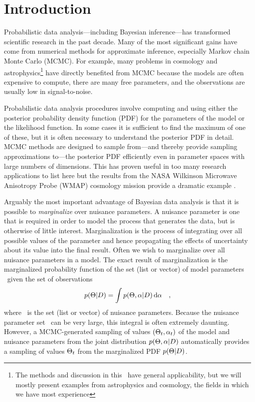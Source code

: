 \section{Introduction}

Probabilistic data analysis---including Bayesian inference---has
transformed scientific research in the past decade. Many of the most
significant gains have come from numerical methods for approximate
inference, especially Markov chain Monte Carlo (MCMC).  For example,
many problems in cosmology and astrophysics\footnote{The methods and
  discussion in this \paper\ have general applicability, but we will
  mostly present examples from astrophysics and cosmology, the fields
  in which we have most experience} have directly benefited from MCMC
because the models are often expensive to compute, there are many free
parameters, and the observations are usually low in signal-to-noise.

Probabilistic data analysis procedures involve computing and using
either the posterior probability density function (PDF) for the
parameters of the model or the likelihood function. In some cases it
is sufficient to find the maximum of one of these, but it is often
necessary to understand the posterior PDF in detail.  MCMC methods are
designed to sample from---and thereby provide sampling approximations
to---the posterior PDF efficiently even in parameter spaces with large
numbers of dimensions. This has proven useful in too many research
applications to list here but the results from the NASA Wilkinson
Microwave Anisotropy Probe (WMAP) cosmology mission provide a dramatic
example \citep[for example,][]{Dunkley:2005}.

Arguably the most important advantage of Bayesian data analysis is
that it is possible to \emph{marginalize} over nuisance parameters. A
nuisance parameter is one that is required in order to model the
process that generates the data, but is otherwise of little interest.
Marginalization is the process of integrating over all possible values of
the  parameter and hence propagating the effects of uncertainty about
its value into the final result.  Often we wish to marginalize over all
nuisance parameters in a model.  The exact result of marginalization
is the marginalized probability function \pr{\model | \data}
of the set (list or vector) of model parameters
\model\ given the set of observations \data
\begin{equation}
    \eqlabel{marginalization}
    \pr{\model | \data} = \int
        \pr{ \model, \nuisance | \data} \,
        \dd  \nuisance \quad,
\end{equation}
where \nuisance\ is the set (list or vector) of nuisance
parameters. Because the nuisance parameter set \nuisance\ can be very large, this
integral is often extremely daunting.  However, a
MCMC-generated sampling of values $(\Theta_t,\alpha_t)$ of the
model and nuisance parameters from the joint distribution $p(\Theta,
  \alpha | D)$ automatically provides a sampling of values
$\Theta_t$ from the marginalized PDF $p(\Theta | D)$.

